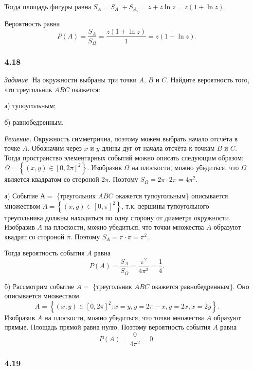 \documentclass{book}
\begin{document}
Тогда площадь фигуры равна $S_A = S_{A_1} + S_{A_2} = z + z \ln z = z \left( 1 + \ln z \right)$.

Вероятность равна
$$P \left( A \right) =
\frac{S_A}{S_{ \Omega }} =
\frac{z \left( 1 + \ln z \right) }{1} =
z \left( 1 + \ln z \right).$$

\subsubsection*{4.18}

\textit{Задание.} На окружности выбраны три точки $A, \, B$ и $C$.
Найдите вероятность того, что треугольник $ABC$ окажется:

а) тупоугольным;

б) равнобедренным.

\textit{Решение.} Окружность симметрична, поэтому можем выбрать начало отсчёта в точке $A$.
Обозначим через $x$ и $y$ длины дуг от начала отсчёта к точкам $B$ и $C$.
Тогда пространство элементарных событий можно описать следующим образом:
$ \Omega =
\left\{  \left( x, y \right) \in \left[0, 2 \pi \right]^2 \right\}$.
Изобразив $ \Omega $ на плоскости, можно убедиться, что $ \Omega $ является квадратом со стороной $2 \pi$.
Поэтому $S_{ \Omega } = 2 \pi \cdot 2 \pi = 4 \pi^2$.

а) Событие $ А = $ \{треугольник $ABC$ окажется тупоугольным\} описывается множеством
$A =
\left\{ \left( x, y \right) \in \left[0, \pi \right]^2 \right\}$,
т.к. вершины тупоугольного треугольника должны находиться по одну сторону от диаметра окружности.
Изобразив $A$ на плоскости, можно убедиться, что точки множества $A$ образуют квадрат со стороной $ \pi $.
Поэтому $S_A = \pi \cdot \pi = \pi^2$.

Тогда вероятность события $A$ равна
$$P \left( A \right) =
\frac{S_A}{S_{ \Omega }} =
\frac{ \pi^2}{4 \pi^2} =
\frac{1}{4}.$$

б) Рассмотрим событие $A = $ \{треугольник $ABC$ окажется равнобедренным\}.
Оно описывается множеством 
$$A = \left\{ \left( x, y \right) \in \left[0, 2 \pi \right]^2: x = y, y = 2 \pi - x, y = 2x, x = 2y \right\}.$$
Изобразив $A$ на плоскости, можно убедиться, что точки множества $A$ образуют прямые.
Площадь прямой равна нулю.
Поэтому вероятность события $A$ равна
$$P \left( A \right) =
\frac{0}{4 \pi^2} =
0.$$

\subsubsection*{4.19}
\end{document}
